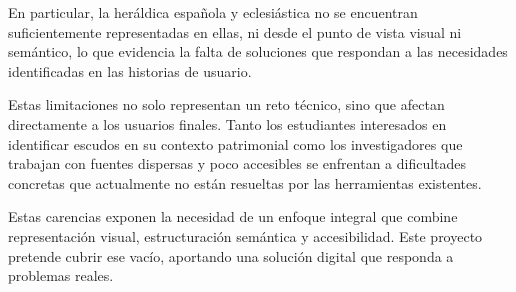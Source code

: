 En particular, la heráldica española y eclesiástica no se encuentran suficientemente representadas 
en ellas, ni desde el punto de vista visual ni semántico, lo que evidencia la falta de soluciones 
que respondan a las necesidades identificadas en las historias de usuario.

Estas limitaciones no solo representan un reto técnico, sino que afectan directamente a los 
usuarios finales. Tanto los estudiantes interesados en identificar escudos en su contexto patrimonial 
como los investigadores que trabajan con fuentes dispersas y poco accesibles se enfrentan a 
dificultades concretas que actualmente no están resueltas por las herramientas existentes.

Estas carencias exponen la necesidad de un enfoque integral que combine representación
visual, estructuración semántica y accesibilidad. Este proyecto pretende cubrir ese vacío,
aportando una solución digital que responda a problemas reales.